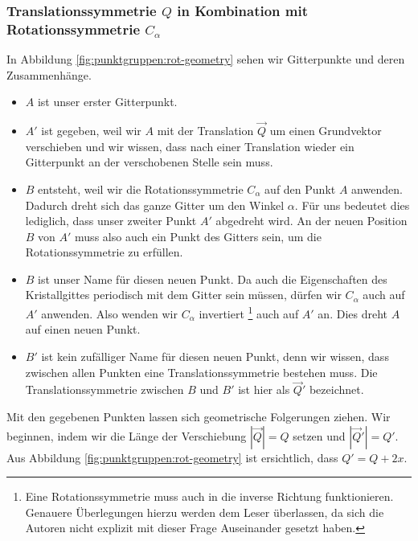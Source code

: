  \subsubsection{Translationssymmetrie $Q$ in Kombination mit Rotationssymmetrie $C_\alpha$}     %
 In Abbildung \ref{fig:punktgruppen:rot-geometry} sehen wir Gitterpunkte und deren Zusammenhänge.

 \begin{itemize}
     \item  \(A\) ist unser erster Gitterpunkt. 

     \item  \(A'\) ist gegeben, weil wir \(A\) mit der Translation \(\vec{Q}\) um einen Grundvektor verschieben und wir wissen, 
            dass nach einer Translation wieder ein Gitterpunkt an der verschobenen Stelle sein muss.
     \item \(B\) entsteht, weil wir die Rotationssymmetrie \(C_\alpha\) auf den Punkt \(A\) anwenden.
         Dadurch dreht sich das ganze Gitter um den Winkel \(\alpha\). 
         Für uns bedeutet dies lediglich, dass unser zweiter Punkt \(A'\) abgedreht wird.
         An der neuen Position \(B\) von \(A'\) muss also auch ein Punkt des Gitters sein, um die Rotationssymmetrie zu erfüllen.
     \item \(B\) ist unser Name für diesen neuen Punkt.
         Da auch die Eigenschaften des Kristallgittes periodisch mit dem Gitter sein müssen, dürfen wir \(C_\alpha\) auch auf \(A'\) anwenden.
         Also wenden wir \(C_\alpha\) invertiert
         \footnote{Eine Rotationssymmetrie muss auch in die inverse Richtung funktionieren.
         Genauere Überlegungen hierzu werden dem Leser überlassen, da sich die Autoren nicht explizit mit dieser Frage Auseinander gesetzt haben.} 
         auch auf \(A'\) an. 
         Dies dreht \(A\) auf einen neuen Punkt.
     \item \(B'\) ist kein zufälliger Name für diesen neuen Punkt, denn wir wissen, dass zwischen allen Punkten eine Translationssymmetrie bestehen muss.
         Die  Translationssymmetrie zwischen \(B\) und \(B'\) ist hier als \(\vec{Q}'\) bezeichnet.
 \end{itemize}  
 Mit den gegebenen Punkten lassen sich geometrische Folgerungen ziehen.
 Wir beginnen, indem wir die Länge der Verschiebung \(|\vec{Q}| = Q\) setzen und \(|\vec{Q}'| = Q'\).
 Aus Abbildung \ref{fig:punktgruppen:rot-geometry} ist ersichtlich, dass \(Q' = Q + 2x\).
